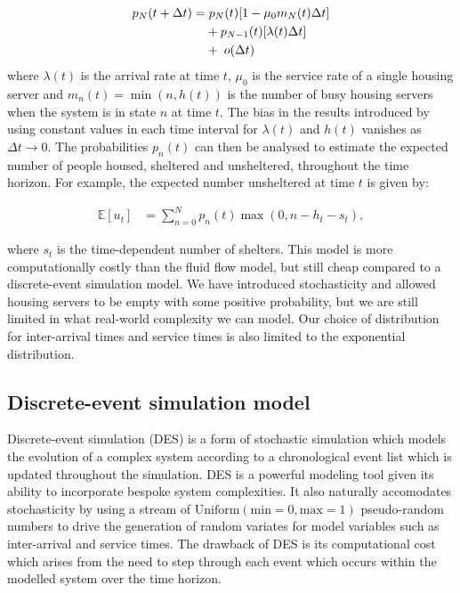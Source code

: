 \documentclass[12pt,a4paper]{article}
\begin{document}
% 
\begin{align*}
  p_N(t+\Delta t) = & \hspace{0.1cm} p_{N}(t)[1-\mu_0 m_N(t) \Delta t] \\
                    & + p_{N-1}(t)[\lambda(t) \Delta t] \\
                    & + \hspace{0.1cm} o(\Delta t)
\end{align*}
% 
where $\lambda(t)$ is the arrival rate at time $t$, $\mu_0$ is the service rate of a single housing server and $m_n(t) = \min(n,h(t))$ is the number of busy housing servers when the system is in state $n$ at time $t$. The bias in the results introduced by using constant values in each time interval for $\lambda(t)$ and $h(t)$ vanishes as $\Delta t \to 0$. The probabilities $p_n(t)$ can then be analysed to estimate the expected number of people housed, sheltered and unsheltered, throughout the time horizon. For example, the expected number unsheltered at time $t$ is given by:

\begin{align} \label{u_t_mmt}
\mathbb{E}[u_t] & = \sum_{n=0}^{N} p_n(t) \max(0,n-h_t-s_t), 
\end{align}

where $s_t$ is the time-dependent number of shelters. This model is more computationally costly than the fluid flow model, but still cheap compared to a discrete-event simulation model. We have introduced stochasticity and allowed housing servers to be empty with some positive probability, but we are still limited in what real-world complexity we can model. Our choice of distribution for inter-arrival times and service times is also limited to the exponential distribution. 

\subsection{Discrete-event simulation model} \label{DES}
%
Discrete-event simulation (DES) is a form of stochastic simulation which models the evolution of a complex system according to a chronological event list which is updated throughout the simulation. DES is a powerful modeling tool given its ability to incorporate bespoke system complexities. It also naturally accomodates stochasticity by using a stream of $\text{Uniform}(\text{min} = 0, \text{max} = 1)$ pseudo-random numbers to drive the generation of random variates for model variables such as inter-arrival and service times. The drawback of DES is its computational cost which arises from the need to step through each event which occurs within the modelled system over the time horizon.
\end{document}
